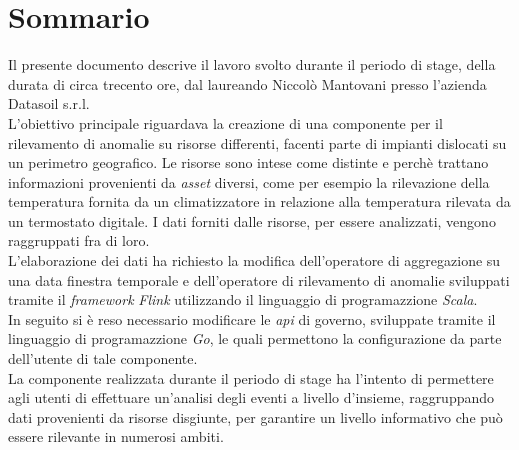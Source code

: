 
\cleardoublepage
{}
{}
\begingroup
\let\clearpage\relax
\let\cleardoublepage\relax
\let\cleardoublepage\relax

\chapter*{Sommario}

Il presente documento descrive il lavoro svolto durante il periodo di stage, della durata di circa trecento ore, dal laureando Niccolò Mantovani presso l'azienda Datasoil s.r.l.\\
L'obiettivo principale riguardava la creazione di una componente per il rilevamento di anomalie su risorse differenti, facenti parte di impianti dislocati su un perimetro geografico. Le risorse sono intese come distinte e perchè trattano informazioni provenienti da \textit{asset} diversi, come per esempio la rilevazione della temperatura fornita da un climatizzatore in relazione alla temperatura rilevata da un termostato digitale. I dati forniti dalle risorse, per essere analizzati, vengono raggruppati fra di loro.\\
L'elaborazione dei dati ha richiesto la modifica dell'operatore di aggregazione su una data finestra temporale e dell'operatore di rilevamento di anomalie sviluppati tramite il \textit{\textit{\gls{framework}}} \textit{Flink} utilizzando il linguaggio di programazzione \textit{Scala}.\\
In seguito si è reso necessario modificare le \textit{\gls{api}} di governo, sviluppate tramite il linguaggio di programazzione \textit{Go}, le quali permettono la configurazione da parte dell'utente di tale componente.\\
La componente realizzata durante il periodo di stage ha l'intento di permettere agli utenti di effettuare un'analisi degli eventi a livello d'insieme, raggruppando dati provenienti da risorse disgiunte, per garantire un livello informativo che può essere rilevante in numerosi ambiti.

%
%

\endgroup			

\vfill


